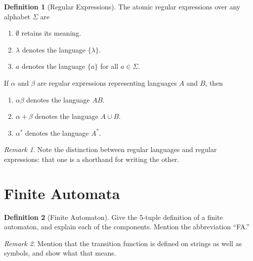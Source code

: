 \documentclass[12 pt, twoside, letterpaper]{article}
\newcommand{\meo}[1]{\texttt{#1}}
\renewcommand{\meo}[1]{\iffalse #1 \fi}
\theoremstyle{definition}
\newtheorem{definition}{Definition}
\theoremstyle{remark}
\newtheorem*{remark}{Remark}
\theoremstyle{plain}
\begin{document}
	\begin{definition}[Regular Expressions]
		The atomic regular expressions over any alphabet $\Sigma$ are
		\begin{enumerate}[label=(\roman*), itemsep = -0.3 ex]
			\item $\emptyset$ retains its meaning.
			\item $\lambda$ denotes the language $\{ \lambda \}$.
			\item $a$ denotes the language $\{ a \}$ for all $a \in \Sigma$.
		\end{enumerate}

		If $\alpha$ and $\beta$ are regular expressions representing languages $A$ and $B$, then
		\begin{enumerate}[label=(\roman*), itemsep = -0.3 ex]
			\item $\alpha \beta$ denotes the language $AB$.
			\item $\alpha + \beta$ denotes the language $A \cup B$.
			\item $\alpha^*$ denotes the language $A^*$.
		\end{enumerate}
	\end{definition}

	\begin{remark}
		Note the distinction between regular languages and regular expressions: that one is a shorthand for writing the other.
	\end{remark}

	\meo{
		I could mention here that regular expressions are an example of a grammar, shockingly belonging to the class of regular grammars.
	}


\section{Finite Automata} %
\label{sec:finite_automata}

	\begin{definition}[Finite Automaton]
		Give the 5-tuple definition of a finite automaton, and explain each of the components.
		Mention the abbreviation ``FA.''
	\end{definition}

	\begin{remark}
		Mention that the transition function is defined on strings as well as symbols, and show what that means.
	\end{remark}
\end{document}
